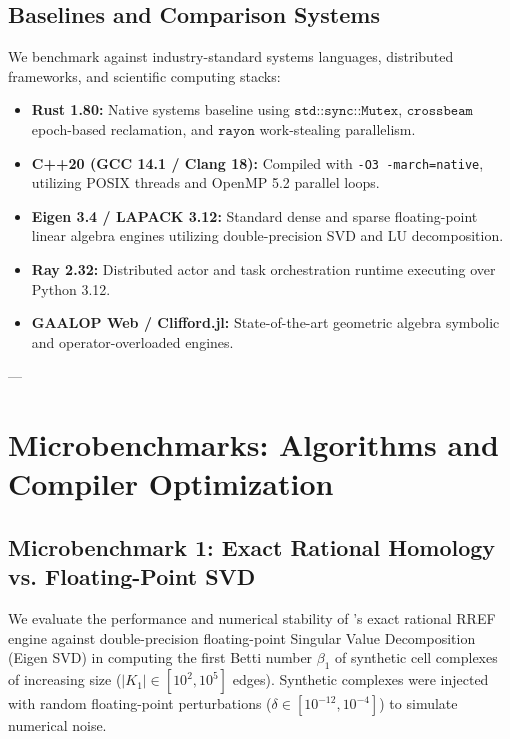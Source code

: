\subsection{Baselines and Comparison Systems}
We benchmark \ToposLang{} against industry-standard systems languages, distributed frameworks, and scientific computing stacks:
\begin{itemize}[leftmargin=1.5cm]
    \item \textbf{Rust 1.80:} Native systems baseline using $\texttt{std::sync::Mutex}$, $\texttt{crossbeam}$ epoch-based reclamation, and $\texttt{rayon}$ work-stealing parallelism.
    \item \textbf{C++20 (GCC 14.1 / Clang 18):} Compiled with \texttt{-O3 -march=native}, utilizing POSIX threads and OpenMP 5.2 parallel loops.
    \item \textbf{Eigen 3.4 / LAPACK 3.12:} Standard dense and sparse floating-point linear algebra engines utilizing double-precision SVD and LU decomposition.
    \item \textbf{Ray 2.32:} Distributed actor and task orchestration runtime executing over Python 3.12.
    \item \textbf{GAALOP Web / Clifford.jl:} State-of-the-art geometric algebra symbolic and operator-overloaded engines.
\end{itemize}

---

\section{Microbenchmarks: Algorithms and Compiler Optimization}
\label{sec:microbenchmarks}

\subsection{Microbenchmark 1: Exact Rational Homology vs. Floating-Point SVD}
We evaluate the performance and numerical stability of \ToposLang{}'s exact rational RREF engine against double-precision floating-point Singular Value Decomposition (Eigen SVD) in computing the first Betti number $\beta_1$ of synthetic cell complexes of increasing size ($|K_1| \in [10^2, 10^5]$ edges). Synthetic complexes were injected with random floating-point perturbations ($\delta \in [10^{-12}, 10^{-4}]$) to simulate numerical noise.

